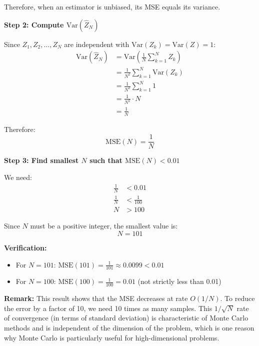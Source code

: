 \documentclass[11pt]{article}
\begin{document}
Therefore, when an estimator is unbiased, its MSE equals its variance.

\vspace{0.5em}

\textbf{Step 2: Compute $\text{Var}(\hat{Z}_N)$}

Since $Z_1, Z_2, \ldots, Z_N$ are independent with $\text{Var}(Z_k) = \text{Var}(Z) = 1$:
\begin{align*}
\text{Var}(\hat{Z}_N) &= \text{Var}\left(\frac{1}{N} \sum_{k=1}^{N} Z_k\right) \\
&= \frac{1}{N^2} \sum_{k=1}^{N} \text{Var}(Z_k) \tag{by independence} \\
&= \frac{1}{N^2} \sum_{k=1}^{N} 1 \\
&= \frac{1}{N^2} \cdot N \\
&= \frac{1}{N}
\end{align*}

Therefore:
\[
\boxed{\text{MSE}(N) = \frac{1}{N}}
\]

\vspace{0.5em}

\textbf{Step 3: Find smallest $N$ such that $\text{MSE}(N) < 0.01$}

We need:
\begin{align*}
\frac{1}{N} &< 0.01 \\
\frac{1}{N} &< \frac{1}{100} \\
N &> 100
\end{align*}

Since $N$ must be a positive integer, the smallest value is:
\[
\boxed{N = 101}
\]

\vspace{1em}

\textbf{Verification:}
\begin{itemize}[leftmargin=2em]
    \item For $N = 101$: $\text{MSE}(101) = \frac{1}{101} \approx 0.0099 < 0.01$ \checkmark
    \item For $N = 100$: $\text{MSE}(100) = \frac{1}{100} = 0.01$ (not strictly less than 0.01)
\end{itemize}

\vspace{1em}

\textbf{Remark:} This result shows that the MSE decreases at rate $O(1/N)$. To reduce the error by a factor of 10, we need 10 times as many samples. This $1/\sqrt{N}$ rate of convergence (in terms of standard deviation) is characteristic of Monte Carlo methods and is independent of the dimension of the problem, which is one reason why Monte Carlo is particularly useful for high-dimensional problems.
\end{document}
